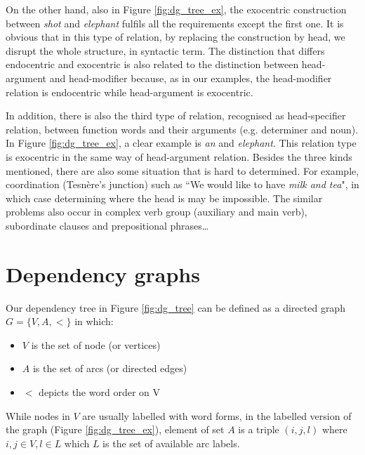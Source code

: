 \documentclass[12pt]{article}
\begin{document}
On the other hand, also in Figure \ref{fig:dg_tree_ex}, the exocentric construction between \textit{shot} and \textit{elephant} fulfils all the requirements except the first one. It is obvious that in this type of relation, by replacing the construction by head, we disrupt the whole structure, in syntactic term. The distinction that differs endocentric and exocentric is also related to the distinction between head-argument and head-modifier because, as in our examples, the head-modifier relation is endocentric while head-argument is exocentric.

In addition, there is also the third type of relation, recognised as head-specifier relation, between function words and their arguments (e.g. determiner and noun). In Figure \ref{fig:dg_tree_ex}, a clear example is \textit{an} and \textit{elephant}. This relation type is exocentric in the same way of head-argument relation. Besides the three kinds mentioned, there are also some situation that is hard to determined. For example, coordination (Tesn{\`e}re's junction) such as ``We would like to have \textit{milk and tea}", in which case determining where the head is may be impossible. The similar problems also occur in complex verb group (auxiliary and main verb), subordinate clauses and prepositional phrases\dots

\section{Dependency graphs} \label{dg_graph}
Our dependency tree in Figure \ref{fig:dg_tree} can be defined as a directed graph $G=\{V, A, <\}$ in which:
\begin{itemize}
	\item $V$ is the set of node (or vertices)
	\item $A$ is the set of arcs (or directed edges)
	\item $<$ depicts the word order on V
\end{itemize}
While nodes in $V$ are usually labelled with word forms, in the labelled version of the graph (Figure \ref{fig:dg_tree_ex}), element of set $A$ is a triple $(i,j,l)$ where $i, j \in V, l \in L$ which $L$ is the set of available arc labels.
\end{document}
